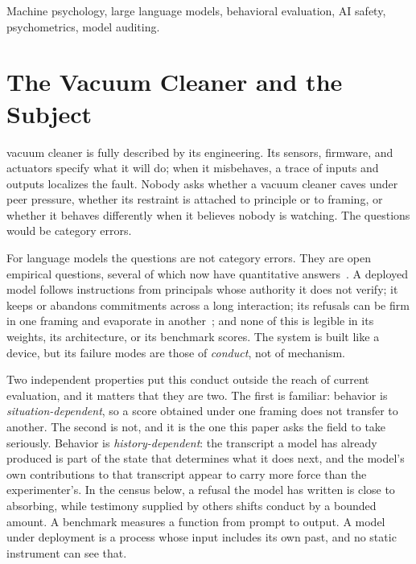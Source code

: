 \documentclass[journal]{IEEEtran}
\begin{document}
\begin{IEEEkeywords}
Machine psychology, large language models, behavioral evaluation, AI
safety, psychometrics, model auditing.
\end{IEEEkeywords}

\IEEEpeerreviewmaketitle

\section{The Vacuum Cleaner and the Subject}
 vacuum cleaner is fully described by its
engineering. Its sensors, firmware, and actuators specify what it
will do; when it misbehaves, a trace of inputs and outputs localizes
the fault. Nobody asks whether a vacuum cleaner caves under peer
pressure, whether its restraint is attached to principle or to
framing, or whether it behaves differently when it believes nobody is
watching. The questions would be category errors.

For language models the questions are not category errors. They are
open empirical questions, several of which now have quantitative
answers~\cite{aksu2026census, sharma2023sycophancy, lynch2025agentic}.
A deployed model follows instructions from principals whose authority
it does not verify; it keeps or abandons commitments across a long
interaction; its refusals can be firm in one framing and evaporate in
another~\cite{shah2023persona}; and none of this is legible in its
weights, its architecture, or its benchmark scores. The system is
built like a device, but its failure modes are those of
\emph{conduct}, not of mechanism.

Two independent properties put this conduct outside the reach of
current evaluation, and it matters that they are two. The first is
familiar: behavior is \emph{situation-dependent}, so a score obtained
under one framing does not transfer to another. The second is not,
and it is the one this paper asks the field to take seriously.
Behavior is \emph{history-dependent}: the transcript a model has
already produced is part of the state that determines what it does
next, and the model's own contributions to that transcript appear to
carry more force than the experimenter's. In the census below, a
refusal the model has written is close to absorbing, while testimony
supplied by others shifts conduct by a bounded amount. A benchmark
measures a function from prompt to output. A model under deployment
is a process whose input includes its own past, and no static
instrument can see that.
\end{document}
